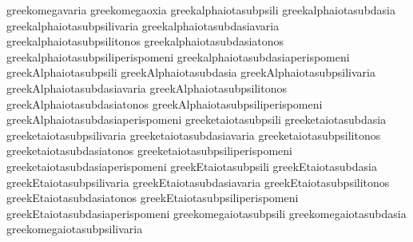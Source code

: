  greekomegavaria                     {}
 greekomegaoxia                      {}
 greekalphaiotasubpsili              {} %
 greekalphaiotasubdasia              {}
 greekalphaiotasubpsilivaria         {}
 greekalphaiotasubdasiavaria         {}
 greekalphaiotasubpsilitonos         {}
 greekalphaiotasubdasiatonos         {}
 greekalphaiotasubpsiliperispomeni   {}
 greekalphaiotasubdasiaperispomeni   {}
 greekAlphaiotasubpsili              {}
 greekAlphaiotasubdasia              {}
 greekAlphaiotasubpsilivaria         {}
 greekAlphaiotasubdasiavaria         {}
 greekAlphaiotasubpsilitonos         {}
 greekAlphaiotasubdasiatonos         {}
 greekAlphaiotasubpsiliperispomeni   {}
 greekAlphaiotasubdasiaperispomeni   {}
 greeketaiotasubpsili                {} %
 greeketaiotasubdasia                {}
 greeketaiotasubpsilivaria           {}
 greeketaiotasubdasiavaria           {}
 greeketaiotasubpsilitonos           {}
 greeketaiotasubdasiatonos           {}
 greeketaiotasubpsiliperispomeni     {}
 greeketaiotasubdasiaperispomeni     {}
 greekEtaiotasubpsili                {}
 greekEtaiotasubdasia                {}
 greekEtaiotasubpsilivaria           {}
 greekEtaiotasubdasiavaria           {}
 greekEtaiotasubpsilitonos           {}
 greekEtaiotasubdasiatonos           {}
 greekEtaiotasubpsiliperispomeni     {}
 greekEtaiotasubdasiaperispomeni     {}
 greekomegaiotasubpsili              {} %
 greekomegaiotasubdasia              {}
 greekomegaiotasubpsilivaria         {}
